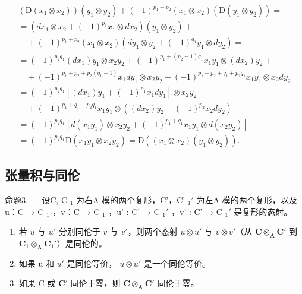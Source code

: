 \[
\begin{array}{l} \left(\mathrm{D} (x _ {1} \otimes x _ {2})\right) (y _ {1} \otimes y _ {2}) + (- 1) ^ {p _ {1} + p _ {2}} (x _ {1} \otimes x _ {2}) (\mathrm{D} (y _ {1} \otimes y _ {2})) = \\ = (d x _ {1} \otimes x _ {2} + (- 1) ^ {p _ {1}} x _ {1} \otimes d x _ {2}) (y _ {1} \otimes y _ {2}) + \\ \quad + (- 1) ^ {p _ {1} + p _ {2}} (x _ {1} \otimes x _ {2}) (d y _ {1} \otimes y _ {2} + (- 1) ^ {q _ {1}} y _ {1} \otimes d y _ {2}) = \\ = (- 1) ^ {p _ {2} q _ {1}} (d x _ {1}) y _ {1} \otimes x _ {2} y _ {2} + (- 1) ^ {p _ {1} + (p _ {2} - 1) q _ {1}} x _ {1} y _ {1} \otimes (d x _ {2}) y _ {2} + \\ \quad + (- 1) ^ {p _ {1} + p _ {2} + p _ {2} (q _ {1} - 1)} x _ {1} d y _ {1} \otimes x _ {2} y _ {2} + (- 1) ^ {p _ {1} + p _ {2} + q _ {1} + p _ {2} q _ {1}} x _ {1} y _ {1} \otimes x _ {2} d y _ {2} \\ = (- 1) ^ {p _ {2} q _ {1}} [ (d x _ {1}) y _ {1} + (- 1) ^ {p _ {1}} x _ {1} d y _ {1} ] \otimes x _ {2} y _ {2} + \\ \quad + (- 1) ^ {p _ {1} + q _ {1} + p _ {2} q _ {1}} x _ {1} y _ {1} \otimes ((d x _ {2}) y _ {2} + (- 1) ^ {p _ {2}} x _ {2} d y _ {2}) \\ = (- 1) ^ {p _ {2} q _ {1}} [ d (x _ {1} y _ {1}) \otimes x _ {2} y _ {2} + (- 1) ^ {p _ {1} + q _ {1}} x _ {1} y _ {1} \otimes d (x _ {2} y _ {2}) ] \\ = (- 1) ^ {p _ {2} q _ {1}} \mathrm{D} (x _ {1} y _ {1} \otimes x _ {2} y _ {2}) = \mathrm{D} ((x _ {1} \otimes x _ {2}) (y _ {1} \otimes y _ {2}))  . \end{array}
\]

\subsection{张量积与同伦}

命题3. --- 设C, C \(_{1}\) 为右A-模的两个复形，C'，C' \(_{1}'\) 为左A-模的两个复形，以及u：C → C \(_{1}\) ，v：C → C \(_{1}\) ，u' : C' → C \(_{1}'\) ，v' : C' → C \(_{1}'\) 是复形的态射。

\begin{enumerate}
\def\labelenumi{\alph{enumi})}
\item
  若 \(u\) 与 \(u'\) 分别同伦于 \(v\) 与 \(v'\)，则两个态射 \(u \otimes u'\) 与 \(v \otimes v'\)（从 \(\mathbf{C} \otimes_{\mathbf{A}} \mathbf{C}'\) 到 \(\mathbf{C}_1 \otimes_{\mathbf{A}} \mathbf{C}_1'\)）是同伦的。
\item
  如果 u 和 \(u'\) 是同伦等价， \(u \otimes u'\) 是一个同伦等价。
\item
  如果 C 或 \(\mathbf{C}'\) 同伦于零，则 \(\mathbf{C} \otimes_{\mathbf{A}} \mathbf{C}'\) 同伦于零。
\end{enumerate}

